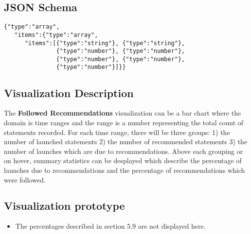 \documentclass{article}
\begin{document}
\subsection{JSON Schema}
\begin{lstlisting}[]
{"type":"array",
   "items":{"type":"array",
      "items":[{"type":"string"}, {"type":"string"},
               {"type":"number"}, {"type":"number"},
               {"type":"number"}, {"type":"number"},
               {"type":"number"}]}}
\end{lstlisting}
\subsection{Visualization Description}

The {\bf Followed Recommendations} visualization can be a bar chart
where the domain is time ranges and the range is a number
representing the total count of statements recorded. For each time
range, there will be three groups: 1) the number of launched
statements 2) the number of recommended statements 3) the number of
launches which are due to recommendations. Above each grouping or on
hover, summary statistics can be desplayed which describe the
percentage of launches due to recommendations and the percentage of
recommendations which were followed.

\subsection{Visualization prototype}

\begin{itemize}
\item The percentages described in section 5.9 are not displayed here.
\end{itemize}
\end{document}
